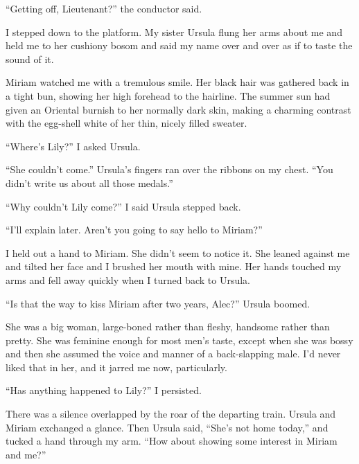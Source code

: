 \documentclass{novel}
\begin{document}
\mainmatter
\cleartorecto
\thispagestyle{empty}

\begin{ChapterStart}
\vspace{3\nbs}
\end{ChapterStart}

“Getting off, Lieutenant?” the conductor said.

I stepped down to the platform. My sister Ursula flung her arms about me and held me to her cushiony bosom and said my name over and over as if to taste the sound of it.

Miriam watched me with a tremulous smile. Her black hair was gathered back in a tight bun, showing her high forehead to the hairline. The summer sun had given an Oriental burnish to her normally dark skin, making a charming contrast with the egg-shell white of her thin, nicely filled sweater.

“Where’s Lily?” I asked Ursula.

“She couldn’t come.” Ursula’s fingers ran over the ribbons on my chest. “You didn’t write us about all those medals.”

“Why couldn’t Lily come?” I said Ursula stepped back.

“I’ll explain later. Aren’t you going to say hello to Miriam?”

I held out a hand to Miriam. She didn’t seem to notice it. She leaned against me and tilted her face and I brushed her mouth with mine. Her hands touched my arms and fell away quickly when I turned back to Ursula.

“Is that the way to kiss Miriam after two years, Alec?” Ursula boomed.

She was a big woman, large-boned rather than fleshy, handsome rather than pretty. She was feminine enough for most men’s taste, except when she was bossy and then she assumed the voice and manner of a back-slapping male. I’d never liked that in her, and it jarred me now, particularly.

“Has anything happened to Lily?” I persisted.

There was a silence overlapped by the roar of the departing train. Ursula and Miriam exchanged a glance. Then Ursula said, “She’s not home today,” and tucked a hand through my arm. “How about showing some interest in Miriam and me?”
\end{document}
